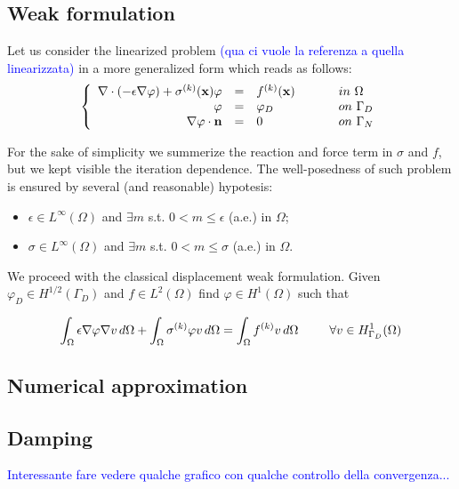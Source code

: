 \subsection{Weak formulation}
Let us consider the linearized problem \textcolor{blue}{(qua ci vuole la referenza a quella linearizzata)} in a more generalized form which reads as follows:
\begin{equation}
\left\{
\begin{array}{rcll}
\nabla \cdot (-\epsilon \nabla \varphi) + \sigma^{(k)}(\vect{x}) \varphi & = &  f^{(k)}(\vect{x}) & \psp{15} in \psp{2} \Omega \\
\varphi & = & \varphi_D & \psp{15} on \psp{2} \Gamma_D \\
\nabla \varphi \cdot \vect{n} & = & 0 & \psp{15} on \psp{2} \Gamma_N
\end{array}
\right.
\end{equation}

For the sake of simplicity we summerize the reaction and force term in $\sigma$ and $f$, but we kept visible the iteration dependence.
The well-posedness of such problem is ensured by several (and reasonable) hypotesis:
\begin{itemize}
\item $\epsilon \in L^{\infty}(\Omega)$ and $\exists m$ s.t. $0 < m \leq \epsilon$ (a.e.) in $\Omega$;
\item  $\sigma \in L^{\infty}(\Omega)$ and $\exists m$ s.t. $0 < m \leq \sigma$ (a.e.) in $\Omega$.
\end{itemize}

We proceed with the classical displacement weak formulation.
Given $\varphi_D \in H^{1/2}(\Gamma_D)$ and $f \in L^2(\Omega)$ find $\varphi \in H^1(\Omega)$ such that 

\begin{equation}
\int_{\Omega} \epsilon \nabla \varphi \nabla v \, d\Omega + \int_{\Omega} \sigma^{(k)}\varphi v \, d\Omega = \int_{\Omega} f^{(k)}v \, d\Omega \psp{15} \forall v \in H^1_{\Gamma_D}(\Omega)
\end{equation}

\subsection{Numerical approximation}

\subsection{Damping}
\textcolor{blue}{Interessante fare vedere qualche grafico con qualche controllo della convergenza...}



